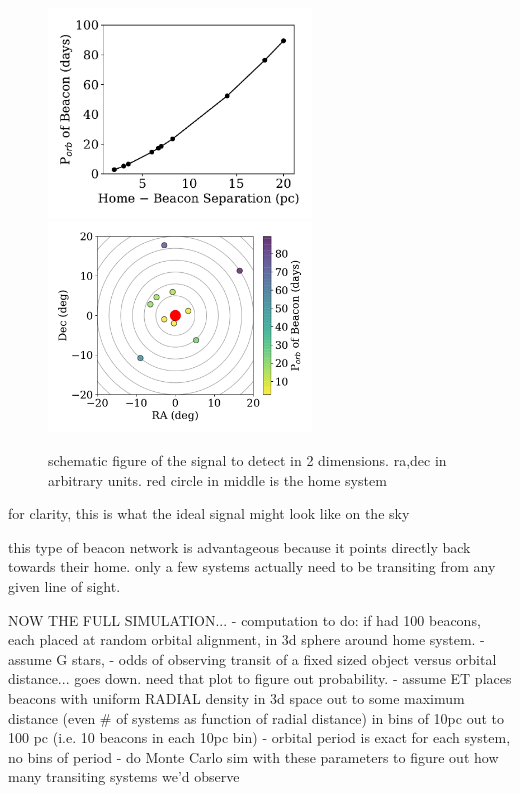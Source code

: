 \documentclass[modern]{aastex62}
\begin{document}
\begin{figure}[]
\centering
\includegraphics[width=2.75in]{../figures/dist_per.pdf}
\includegraphics[width=2.75in]{../figures/sky_per.pdf}
\caption{schematic figure of the signal to detect in 2 dimensions. ra,dec in arbitrary units. red circle in middle is the home system}
\label{fig:2d}
\end{figure}


for clarity, this is what the ideal signal might look like on the sky



this type of beacon network is advantageous because it points directly back towards their home. only a few systems actually need to be transiting from any given line of sight.

NOW THE FULL SIMULATION...
- computation to do: if had 100 beacons, each placed at random orbital alignment, in 3d sphere around home system.
- assume G stars, 
- odds of observing transit of a fixed sized object versus orbital distance... goes down. need that plot to figure out probability. 
- assume ET places beacons with uniform RADIAL density in 3d space out to some maximum distance (even \# of systems as function of radial distance) in bins of 10pc out to 100 pc (i.e. 10 beacons in each 10pc bin)
- orbital period is exact for each system, no bins of period
- do Monte Carlo sim with these parameters to figure out how many transiting systems we'd observe 
\end{document}
